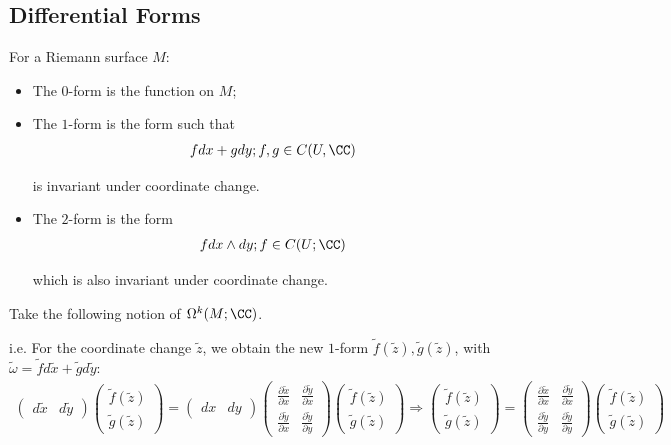 \documentclass[Total.tex]{subfiles}
\begin{document}
	\subsection{Differential Forms}
	\begin{Def}
		For a Riemann surface $M$:
		\begin{itemize}
			\item The $0$-form is the function on $M$;
			\item The $1$-form is the form such that
			\begin{gather*}
				fdx+gdy;f,g\in C(U,\CC)
			\end{gather*}
			
			is invariant under coordinate change. 
			\item The $2$-form is the form 
			\begin{gather*}
				fdx\wedge dy;f\in C(U;\CC)
			\end{gather*}
			
			which is also invariant under coordinate change.  
		\end{itemize}
		
		Take the following notion of $\Omega^k(M;\CC) $. 
	\end{Def}
	
	i.e. For the coordinate change $\tilde{z}$, we obtain the new $1$-form $\tilde{f}(\tilde{z}),\tilde{g}(\tilde{z})$, with $\tilde{\omega}=\tilde{f}d\tilde{x}+\tilde{g}d\tilde{y}$:
	\begin{gather*}
		\begin{pmatrix}
			d\tilde{x}&d\tilde{y}
		\end{pmatrix}\begin{pmatrix}
			\tilde{f}(\tilde{z})\\
			\tilde{g}(\tilde{z})
		\end{pmatrix}=\begin{pmatrix}
			dx&dy
		\end{pmatrix}\begin{pmatrix}
			\frac{\partial\tilde{x}}{\partial x}&\frac{\partial \tilde{y}}{\partial x}\\
			\frac{\partial \tilde{y}}{\partial x}&\frac{\partial \tilde{y}}{\partial y}
		\end{pmatrix}\begin{pmatrix}
			\tilde{f}(\tilde{z})\\
			\tilde{g}(\tilde{z})
		\end{pmatrix}\Rightarrow \begin{pmatrix}
			\tilde{f}(\tilde{z})\\
			\tilde{g}(\tilde{z})
		\end{pmatrix}=\begin{pmatrix}
			\frac{\partial\tilde{x}}{\partial x}&\frac{\partial \tilde{y}}{\partial x}\\
			\frac{\partial \tilde{y}}{\partial y}&\frac{\partial \tilde{y}}{\partial y}
		\end{pmatrix}\begin{pmatrix}
			\tilde{f}(\tilde{z})\\
			\tilde{g}(\tilde{z})
		\end{pmatrix}
	\end{gather*}
	
\end{document}
